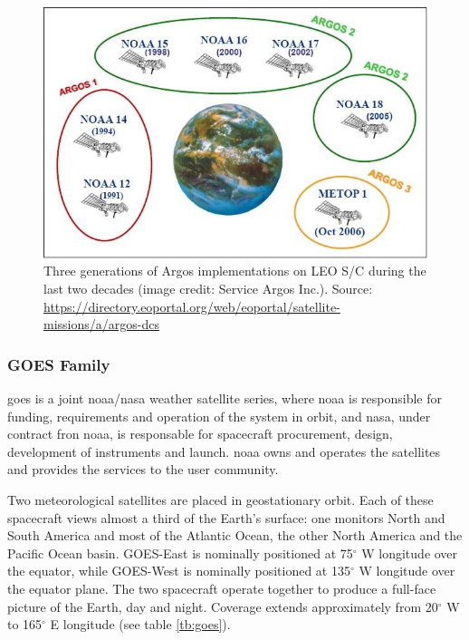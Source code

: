 \documentclass{article}
\def\deg{$^\circ$\xspace}
\begin{document}
\begin{figure}[h!]    
\centering
\includegraphics[width=\linewidth]{figures/argos_history.jpeg}
\caption{Three generations of Argos implementations on LEO S/C during the last two decades (image credit: Service Argos Inc.). Source: \url{https://directory.eoportal.org/web/eoportal/satellite-missions/a/argos-dcs}}
\label{fig:argos}
\end{figure}

\subsubsection{GOES Family}
\label{sssec:goes}


\ac{goes} is a joint \ac{noaa}/\ac{nasa} weather satellite series, where \ac{noaa} is responsible for funding, requirements and operation of the system in orbit, and \ac{nasa}, under contract fron \ac{noaa}, is responsable for spacecraft procurement, design, development of instruments and launch. \ac{noaa} owns and operates the satellites and provides the services to the user community.

Two meteorological satellites are placed in geostationary orbit. Each of these spacecraft views almost a third of the Earth's surface: one monitors North and South America and most of the Atlantic Ocean, the other North America and the Pacific Ocean basin. GOES-East is nominally positioned at 75\deg W longitude over the equator, while GOES-West is nominally positioned at 135\deg W longitude over the equator plane. The two spacecraft operate together to produce a full-face picture of the Earth, day and night. Coverage extends approximately from 20\deg W to 165\deg E longitude (see table \ref{tb:goes}).
\end{document}
